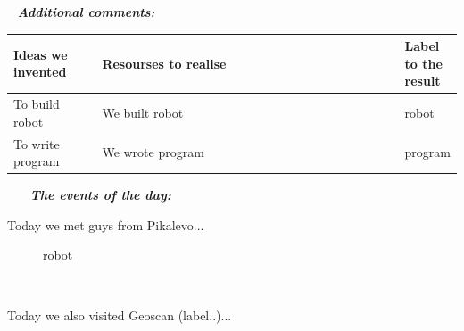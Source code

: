    \newline
  \textit{\textbf{Additional comments:}}
  
  \begin{table}[H]
  	\vspace{-2mm}
  	\begin{center}
  		\begin{tabular}{|p{0.2\linewidth}|p{0.7\linewidth}|p{0.1\linewidth}|}
  			\hline
  			Ideas we invented & Resourses to realise & Label to the result \\
  			\hline
  			To build robot & We built robot & robot \\
  			\hline
  			To write program & We wrote program & program \\
  			\hline
  		\end{tabular}
  	\end{center}
  \end{table}
  
    \newline
   \textit{\textbf{The events of the day:}}
   \begin{enumerate*}
  	 \item Today we met guys from Pikalevo...
  	 \begin{figure}[H]
  	 	\begin{minipage}[h]{1\linewidth}
  	 		\caption{robot}
  	 	\end{minipage}
  	 \end{figure}
   	
   	 \item Today we also visited Geoscan (label..)...
   \end{enumerate*}

\fillpage
